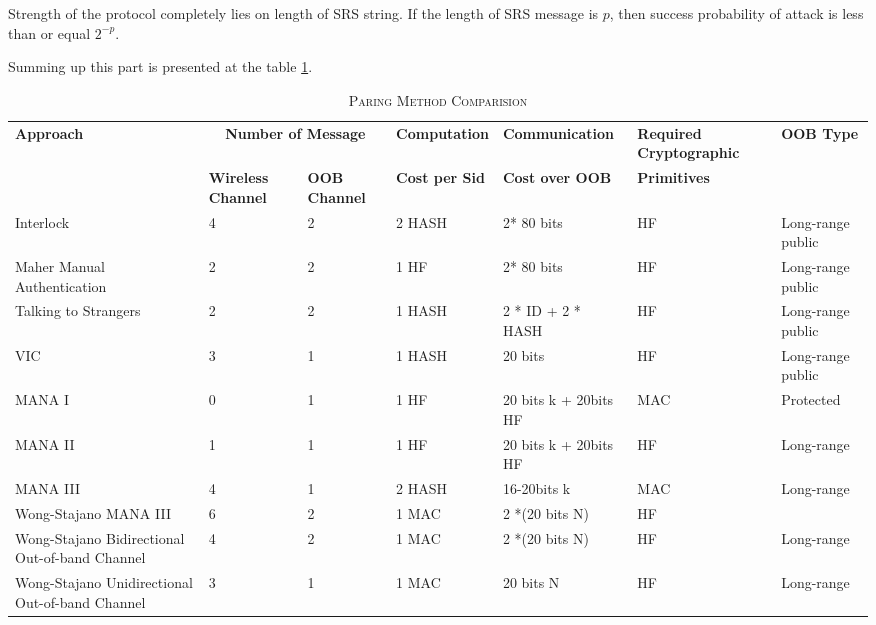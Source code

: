 Strength of the protocol completely lies on length of SRS string. If the length of SRS message is $p$, then success probability of attack is less than or equal $2^{-p}$. 

Summing up this part is presented at the table \ref{paircom}.

\begin{table}[ht] 
\centering
\caption{\textsc{Paring Method Comparision}}
\label{paircom}
{\scriptsize
\begin{tabular}{ | p{2cm} | p{1.4cm} | p{1.4cm} | p{2cm} | p{2.2cm} | p{2cm} | p{2cm}| }
\hline
\textbf{Approach} &\multicolumn{2}{c}{ \textbf{Number of Message}} & \textbf{Computation} & \textbf{Communication} & \textbf{Required Cryptographic} & \textbf{OOB Type}\\ 
 & \textbf{Wireless Channel} & \textbf{OOB Channel} & \textbf{Cost per Sid} & \textbf{Cost over OOB} & \textbf{Primitives} & \\ \hline \hline

Interlock & 4 & 2 & 2 HASH & 2* 80 bits & HF & Long-range public \\ \hline

Maher Manual Authentication & 2 & 2 & 1 HF & 2* 80 bits & HF & Long-range public \\ \hline

Talking to Strangers & 2 &	 2	& 1  HASH &	 2 * ID + 2 * HASH	& HF	&  Long-range public \\ \hline 

VIC & 3	& 1	& 1 HASH 	 & 20 bits & HF & Long-range public \\ \hline 

MANA I	& 0	& 1	& 1 HF & 20 bits k + 20bits HF  & MAC & Protected\\ \hline 

MANA II	& 1	& 1 & 1 HF & 20 bits k + 20bits HF	& HF & Long-range \\ \hline 

MANA III	& 4	& 1 & 2  HASH	& 16-20bits k & MAC & Long-range\\ \hline 

Wong-Stajano MANA III & 6 & 2	& 1 MAC	& 2 *(20 bits N) & HF & \\ \hline 

Wong-Stajano Bidirectional Out-of-band Channel & 4	 & 2	& 1 MAC & 2 *(20 bits N) 	 & HF	 & Long-range\\ \hline 

Wong-Stajano Unidirectional Out-of-band Channel & 3 &	 1	& 1 MAC	 & 20 bits N &	 HF & Long-range \\ \hline 


\end{tabular}}
\end{table}
